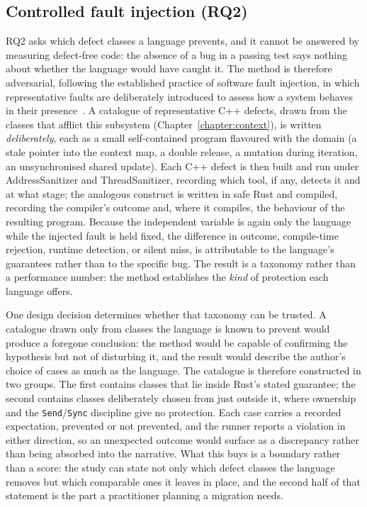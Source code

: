 \documentclass[english,twoside,openright,a4paper,censored,csm,software-track-2020]{HYthesisML}
\begin{document}
\subsection{Controlled fault injection (RQ2)}
RQ2 asks which defect classes a language prevents, and it cannot be answered by measuring
defect-free code: the absence of a bug in a passing test says nothing about whether the
language would have caught it. The method is therefore adversarial, following the established
practice of software fault injection, in which representative faults are deliberately introduced
to assess how a system behaves in their presence~\cite{natella2016fault}. A catalogue of
representative C++ defects, drawn from the classes that afflict this subsystem
(Chapter~\ref{chapter:context}), is written \emph{deliberately}, each as a small self-contained
program flavoured with the domain (a stale pointer into the context map, a double release, a
mutation during iteration, an unsynchronised shared update). Each C++ defect is then built and
run under AddressSanitizer and ThreadSanitizer, recording which tool, if any, detects it and at
what stage; the analogous construct is written in safe Rust and compiled, recording the
compiler's outcome and, where it compiles, the behaviour of the resulting program. Because the
independent variable is again only the language while the injected fault is held fixed, the
difference in outcome, compile-time rejection, runtime detection, or silent miss, is
attributable to the language's guarantees rather than to the specific bug. The result is a
taxonomy rather than a performance number: the method establishes the \emph{kind} of protection
each language offers.

One design decision determines whether that taxonomy can be trusted. A catalogue drawn only
from classes the language is known to prevent would produce a foregone conclusion: the method
would be capable of confirming the hypothesis but not of disturbing it, and the result would
describe the author's choice of cases as much as the language. The catalogue is therefore
constructed in two groups. The first contains classes that lie inside Rust's stated guarantee;
the second contains classes deliberately chosen from just outside it, where ownership and the
\texttt{Send}/\texttt{Sync} discipline give no protection. Each case carries a recorded
expectation, prevented or not prevented, and the runner reports a violation in either
direction, so an unexpected outcome would surface as a discrepancy rather than being absorbed
into the narrative. What this buys is a boundary rather than a score: the study can state not
only which defect classes the language removes but which comparable ones it leaves in place,
and the second half of that statement is the part a practitioner planning a migration
needs.
\end{document}
